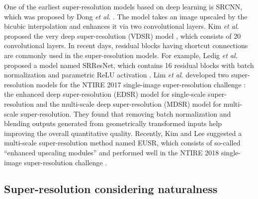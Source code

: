 \documentclass[runningheads]{llncs}
\begin{document}
One of the earliest super-resolution models based on deep learning is SRCNN, which was proposed by Dong \textit{et al.} \cite{dong2014learning}.
The model takes an image upscaled by the bicubic interpolation and enhances it via two convolutional layers.
Kim \textit{et al.} proposed the very deep super-resolution (VDSR) model \cite{kim2016accurate}, which consists of 20 convolutional layers.
In recent days, residual blocks having shortcut connections \cite{he2016deep} are commonly used in the super-resolution models.
For example, Ledig \textit{et al.} \cite{ledig2017photo} proposed a model named SRResNet, which contains 16 residual blocks with batch normalization \cite{ioffe2015batch} and parametric ReLU activation \cite{he2015delving}.
Lim \textit{et al.} \cite{lim2017enhanced} developed two super-resolution models for the NTIRE 2017 single-image super-resolution challenge \cite{timofte2017ntire}: the enhanced deep super-resolution (EDSR) model for single-scale super-resolution and the multi-scale deep super-resolution (MDSR) model for multi-scale super-resolution.
They found that removing batch normalization and blending outputs generated from geometrically transformed inputs help improving the overall quantitative quality.
Recently, Kim and Lee \cite{kim2018deep} suggested a multi-scale super-resolution method named EUSR, which consists of so-called ``enhanced upscaling modules'' and performed well in the NTIRE 2018 single-image super-resolution challenge \cite{timofte2018ntire}.

\subsection{Super-resolution considering naturalness}
\end{document}
